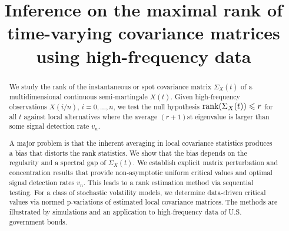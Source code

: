 \documentclass[preprint,aos]{imsart}
\numberwithin{equation}{section}
\theoremstyle{remark}
\renewcommand{\le}{\leqslant}
\begin{document}
\begin{frontmatter}
\title{Inference on the maximal rank of\\ time-varying covariance matrices\\ using high-frequency data}


\begin{abstract}
We study the rank of the instantaneous or spot covariance matrix $\Sigma_X(t)$ of a multidimensional continuous semi-martingale $X(t)$. Given high-frequency observations $X(i/n)$, $i=0,\ldots,n$, we test the null hypothesis $\rank(\Sigma_X(t))\le r$ for all $t$ against local alternatives where the average $(r+1)$st eigenvalue is larger than some signal detection rate $v_n$. %

A major problem is that the inherent averaging in local covariance statistics produces a bias that distorts the rank statistics. We show that the bias depends on the regularity and a spectral gap of $\Sigma_X(t)$. We establish explicit matrix perturbation and concentration results that provide non-asymptotic uniform critical values and optimal signal detection rates $v_n$. This leads to a rank estimation method via sequential testing.  For a class of stochastic volatility models, we determine data-driven critical values via normed p-variations of estimated local covariance matrices. The methods are illustrated by simulations and an application to high-frequency data of U.S. government bonds.




\end{abstract}
\end{frontmatter}
\end{document}
